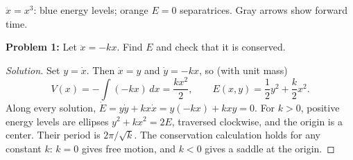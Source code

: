 \documentclass[12pt]{amsart}
\theoremstyle{plain}
\theoremstyle{definition}
\theoremstyle{definition}
\theoremstyle{plain}
\newenvironment{solution}
{\begin{proof}[Solution]}
{\end{proof}}
\begin{document}
\begin{center}
\begin{minipage}{\linewidth}
{\small $\ddot x=x^3$: blue energy levels; orange $E=0$ separatrices. Gray arrows show forward time.}
\end{minipage}
\end{center}

    \clearpage
    \textbf{Problem 1:} Let $\ddot{x}=-kx$. Find $E$ and check that it is conserved.


    \begin{solution}
    Set $y=\dot x$. Then $\dot x=y$ and $\dot y=-kx$, so (with unit mass)
    \[
      V(x)=-\int(-kx)\,dx=\frac{kx^2}{2},\qquad
      \boxed{E(x,y)=\frac12y^2+\frac{k}{2}x^2}.
    \]
    Along every solution,
    $\dot E=y\dot y+kx\dot x=y(-kx)+kxy=0$.
    For $k>0$, positive energy levels are ellipses $y^2+kx^2=2E$,
    traversed clockwise, and the origin is a center. Their period is
    $2\pi/\sqrt{k}$. The conservation calculation holds for any constant $k$:
    $k=0$ gives free motion, and $k<0$ gives a saddle at the origin.
    \end{solution}
\end{document}
